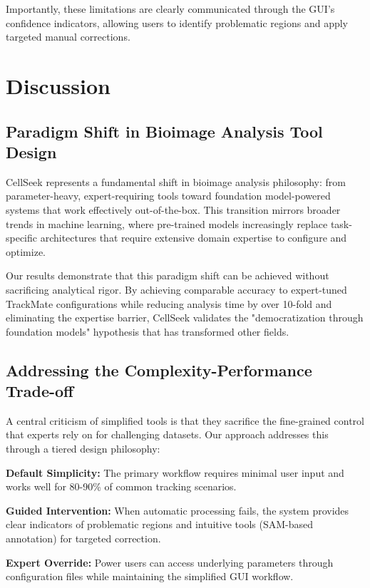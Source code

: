 \documentclass[12pt]{article}
\begin{document}
Importantly, these limitations are clearly communicated through the GUI's confidence indicators, allowing users to identify problematic regions and apply targeted manual corrections.

\section{Discussion}

\subsection{Paradigm Shift in Bioimage Analysis Tool Design}

CellSeek represents a fundamental shift in bioimage analysis philosophy: from parameter-heavy, expert-requiring tools toward foundation model-powered systems that work effectively out-of-the-box. This transition mirrors broader trends in machine learning, where pre-trained models increasingly replace task-specific architectures that require extensive domain expertise to configure and optimize.

Our results demonstrate that this paradigm shift can be achieved without sacrificing analytical rigor. By achieving comparable accuracy to expert-tuned TrackMate configurations while reducing analysis time by over 10-fold and eliminating the expertise barrier, CellSeek validates the "democratization through foundation models" hypothesis that has transformed other fields.

\subsection{Addressing the Complexity-Performance Trade-off}

A central criticism of simplified tools is that they sacrifice the fine-grained control that experts rely on for challenging datasets. Our approach addresses this through a tiered design philosophy:

\textbf{Default Simplicity:} The primary workflow requires minimal user input and works well for 80-90\% of common tracking scenarios.

\textbf{Guided Intervention:} When automatic processing fails, the system provides clear indicators of problematic regions and intuitive tools (SAM-based annotation) for targeted correction.

\textbf{Expert Override:} Power users can access underlying parameters through configuration files while maintaining the simplified GUI workflow.
\end{document}
